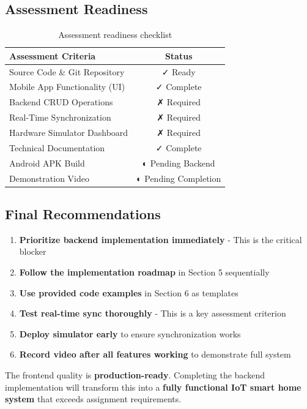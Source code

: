 \documentclass[12pt,a4paper]{article}
\begin{document}
\subsection{Assessment Readiness}

\begin{table}[h]
\centering
\begin{tabularx}{\textwidth}{|X|c|}
\hline
\textbf{Assessment Criteria} & \textbf{Status} \\
\hline
Source Code \& Git Repository & \textcolor{implemented}{✓ Ready} \\
\hline
Mobile App Functionality (UI) & \textcolor{implemented}{✓ Complete} \\
\hline
Backend CRUD Operations & \textcolor{required}{✗ Required} \\
\hline
Real-Time Synchronization & \textcolor{required}{✗ Required} \\
\hline
Hardware Simulator Dashboard & \textcolor{required}{✗ Required} \\
\hline
Technical Documentation & \textcolor{implemented}{✓ Complete} \\
\hline
Android APK Build & \textcolor{pending}{◐ Pending Backend} \\
\hline
Demonstration Video & \textcolor{pending}{◐ Pending Completion} \\
\hline
\end{tabularx}
\caption{Assessment readiness checklist}
\end{table}

\subsection{Final Recommendations}

\begin{enumerate}
    \item \textbf{Prioritize backend implementation immediately} - This is the critical blocker
    \item \textbf{Follow the implementation roadmap} in Section 5 sequentially
    \item \textbf{Use provided code examples} in Section 6 as templates
    \item \textbf{Test real-time sync thoroughly} - This is a key assessment criterion
    \item \textbf{Deploy simulator early} to ensure synchronization works
    \item \textbf{Record video after all features working} to demonstrate full system
\end{enumerate}

The frontend quality is \textbf{production-ready}. Completing the backend implementation will transform this into a \textbf{fully functional IoT smart home system} that exceeds assignment requirements.
\end{document}
